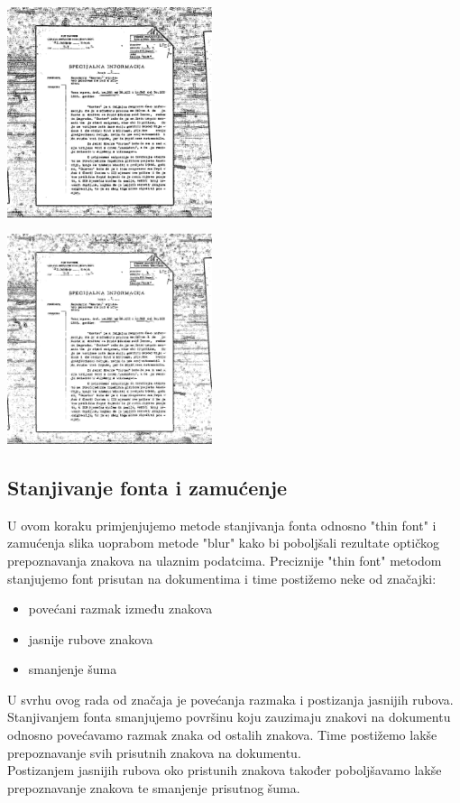 \documentclass[times, utf8, zavrsni, numeric]{fer}
\begin{document}
\begin{center}
\begin{minipage}{0.49\linewidth}
\includegraphics[width=6cm]{images/thresh/Z05353422_thresh_mean.jpg}
\end{minipage}
\hfill
\begin{minipage}{0.49\linewidth}
\includegraphics[width=6cm]{images/thresh/Z05353422_thresh_gauss.jpg}
\end{minipage}
\end{center}

\subsection{Stanjivanje fonta i zamućenje}
U ovom koraku primjenjujemo metode stanjivanja fonta odnosno "thin font" i zamućenja slika uoprabom metode "blur" kako bi poboljšali rezultate optičkog prepoznavanja znakova na ulaznim podatcima. Preciznije "thin font" metodom stanjujemo font prisutan na dokumentima i time postižemo neke od značajki:
\hfill \break
\begin{itemize}
  \item povećani razmak između znakova
  \item jasnije rubove znakova
  \item smanjenje šuma
\end{itemize}
\hfill \break
U svrhu ovog rada od značaja je povećanja razmaka i postizanja jasnijih rubova.
\\
Stanjivanjem fonta smanjujemo površinu koju zauzimaju znakovi na dokumentu odnosno povećavamo razmak znaka od ostalih znakova. Time postižemo lakše prepoznavanje svih prisutnih znakova na dokumentu.
\\
Postizanjem jasnijih rubova oko pristunih znakova također poboljšavamo lakše prepoznavanje znakova te smanjenje prisutnog šuma.
\end{document}
